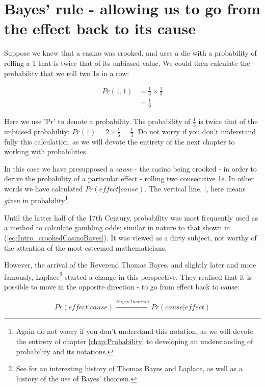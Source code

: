 \documentclass[11pt,fullpage]{book}
\begin{document}
\section{Bayes' rule - allowing us to go from the effect back to its cause}\label{sec:Intro_bayesCauseEffect}
Suppose we knew that a casino was crooked, and uses a die with a probability of rolling a 1 that is twice that of its unbiased value. We could then calculate the probability that we roll two 1s in a row:

\begin{equation}\label{eq:Intro_crookedCasinoBayes}
\begin{align}
Pr(1,1) &= \frac{1}{3} \times \frac{1}{3}\\
&= \frac{1}{9}
\end{align}
\end{equation}

Here we use 'Pr' to denote a probability. The probability of $\frac{1}{3}$ is twice that of the unbiased probability: $Pr(1) = 2\times\frac{1}{6} = \frac{1}{3}$. Do not worry if you don't understand fully this calculation, as we will devote the entirety of the next chapter to working with probabilities.

In this case we have presupposed a \textit{cause} - the casino being crooked - in order to derive the probability of a particular effect - rolling two consecutive 1s. In other words we have calculated $Pr(effect|cause)$. The vertical line, $|$, here means \textit{given} in probability\footnote{Again do not worry if you don't understand this notation, as we will devote the entirety of chapter \ref{chap:Probability} to developing an understanding of probability and its notations.}. 

Until the latter half of the 17th Century, probability was most frequently used as a method to calculate gambling odds; similar in nature to that shown in (\ref{eq:Intro_crookedCasinoBayes}). It was viewed as a dirty subject, not worthy of the attention of the most esteemed mathematicians.

However, the arrival of the Reverend Thomas Bayes, and slightly later and more famously, Laplace\footnote{See \cite{mcgrayne2011theory} for an interesting history of Thomas Bayes and Laplace, as well as a history of the use of Bayes' theorem.} started a change in this perspective. They realised that it is possible to move in the opposite direction - to go from effect back to cause:

\begin{equation}
Pr(effect|cause) \xrightarrow{Bayes' theorem} Pr(cause|effect)
\end{equation}
\end{document}
